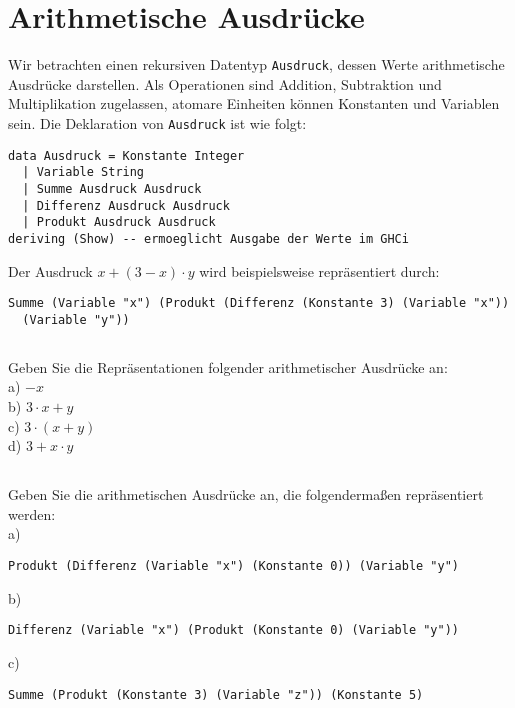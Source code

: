 \documentclass[
  10pt,                   %
  DIV12,
  german,                 %
  oneside,                %
  parskip=half,           %
  headings=normal,        %
  captions=tableheading,  %
]{scrartcl}
\begin{document}
\section{Arithmetische Ausdrücke}
Wir betrachten einen rekursiven Datentyp \lstinline|Ausdruck|, dessen Werte arithmetische Ausdrücke darstellen. Als Operationen sind Addition, Subtraktion und Multiplikation zugelassen, atomare Einheiten können Konstanten und Variablen sein. Die Deklaration
von \lstinline|Ausdruck| ist wie folgt:
\begin{lstlisting}
data Ausdruck = Konstante Integer
  | Variable String
  | Summe Ausdruck Ausdruck
  | Differenz Ausdruck Ausdruck
  | Produkt Ausdruck Ausdruck
deriving (Show) -- ermoeglicht Ausgabe der Werte im GHCi
\end{lstlisting}
Der Ausdruck $x + (3 - x) \cdot y$ wird beispielsweise repräsentiert durch:
\begin{lstlisting}
Summe (Variable "x") (Produkt (Differenz (Konstante 3) (Variable "x")) 
  (Variable "y"))
\end{lstlisting}
\subsection{}
Geben Sie die Repräsentationen folgender arithmetischer Ausdrücke an:\\
a) $-x$\\
b) $3 \cdot x + y$\\
c) $3 \cdot (x + y)$\\
d) $3 + x \cdot y$
\subsection{}
Geben Sie die arithmetischen Ausdrücke an, die folgendermaßen repräsentiert
werden:\\
a) \begin{lstlisting}
Produkt (Differenz (Variable "x") (Konstante 0)) (Variable "y")
\end{lstlisting}
b) \begin{lstlisting}
Differenz (Variable "x") (Produkt (Konstante 0) (Variable "y"))
\end{lstlisting}
c) \begin{lstlisting}
Summe (Produkt (Konstante 3) (Variable "z")) (Konstante 5)
\end{lstlisting}
\end{document}
